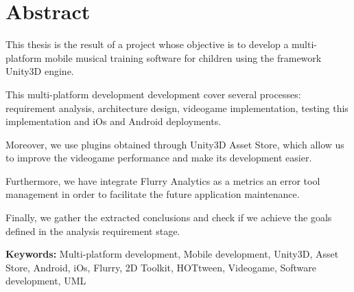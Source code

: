 \cleardoublepage
{}
\chapter*{Abstract}

This thesis is the result of a project whose objective is to develop a multi-platform mobile musical training software for children using the framework Unity3D engine.

This multi-platform development development cover several processes: requirement analysis, architecture design, videogame implementation, testing this implementation and iOs and Android deployments.

Moreover, we use plugins obtained through Unity3D Asset Store, which allow us to improve the videogame performance and make its development easier.

Furthermore, we have integrate Flurry Analytics as a metrics an error tool management in order to facilitate the future application maintenance.

Finally, we gather the extracted conclusions and check if we achieve the goals defined in the analysis requirement stage.


\vfill
\textbf{Keywords:} Multi-platform development, Mobile development, Unity3D, Asset Store, Android, iOs, Flurry, 2D Toolkit, HOTtween, Videogame, Software development, UML
